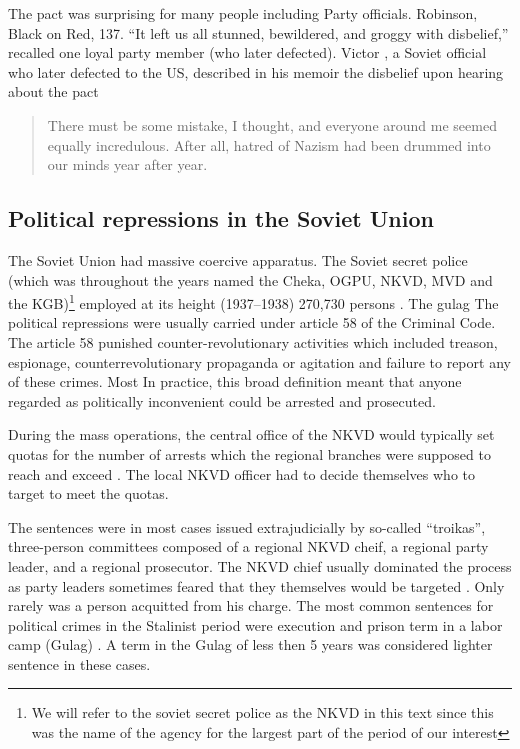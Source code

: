 The pact was surprising for many people including Party officials. 
Robinson, Black on Red, 137. “It left us all stunned, bewildered, and groggy with disbelief,” recalled one loyal party member (who later defected). 
Victor  \citet[p. 332]{kravchenko_i_1947}, a Soviet official who later defected to the US,   described in  his memoir the disbelief upon hearing about the pact  

\begin{quote}
There must be some mistake, I thought, and everyone around me seemed equally incredulous. After all, hatred of Nazism had been drummed into our minds year after year.    

\end{quote}


\subsection{Political repressions in the Soviet Union}
The Soviet Union had massive coercive apparatus. The Soviet secret police (which was throughout the years named the Cheka, OGPU, NKVD, MVD and  the KGB)\footnote{We will refer to the soviet secret police as the NKVD in this text since this was the name of the agency for the largest part of the period of our interest} employed at its height (1937–1938)  270,730 persons \citep[p. 2]{gregory_terror_2009}. The gulag  
The political repressions were usually carried under article 58 of the Criminal Code. The article 58 punished counter-revolutionary activities 
which included treason, espionage, counterrevolutionary propaganda or agitation and  failure to report any of these crimes. Most 
In practice, this broad definition meant that anyone regarded as politically inconvenient could be arrested and prosecuted. 

During the mass operations, the central office of the NKVD would typically set quotas for the number of arrests which the regional branches were supposed to reach and exceed \citep[chapter 6]{gregory_terror_2009}. The local NKVD officer had to decide themselves who to target to meet the quotas. 

The sentences were in most cases issued extrajudicially by so-called \enquote{troikas}, three-person committees composed of a regional NKVD cheif, a regional party leader, and a regional prosecutor. The NKVD chief usually dominated the process as party leaders sometimes feared that they themselves would be targeted \citep[p. 82]{snyder_bloodlands:_2011}. Only rarely was a person acquitted from his charge. 
The most common sentences for political crimes in the Stalinist period were  execution and prison term in a labor camp (Gulag) \citep[p. 21]{gregory_terror_2009}. 
A term in the Gulag of less then 5 years was considered lighter sentence in these cases.

